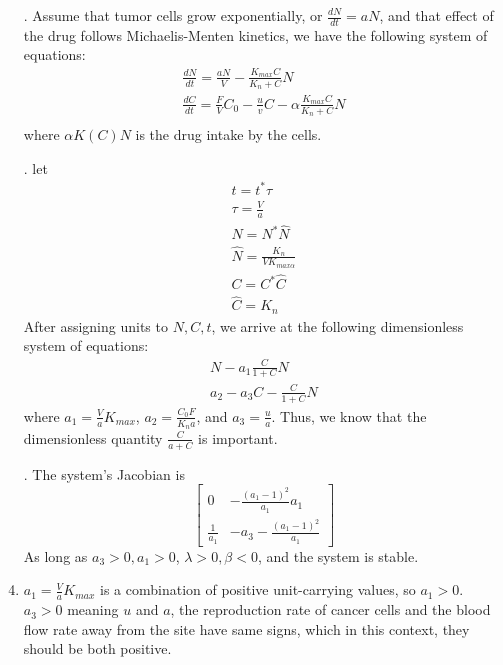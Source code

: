 
\begin{homeworkProblem}[25]
\begin{enumerate}
\addtocounter{enumi}{1}
\item[\color{red}\theenumi.]
    Assume that tumor cells grow exponentially, or $\frac{dN}{dt} = aN $, and that effect of the drug follows Michaelis-Menten kinetics, we have the following system of equations: \begin{align*}
        \frac{dN}{dt} = \frac{aN}{V} - \frac{K_{max}C}{K_n + C}N \\
        \frac{dC}{dt} = \frac{F}{V}C_0 - \frac{u}{v}C - \alpha\frac{K_{max}C}{K_n +C}N \\
    \end{align*}
    where $\alpha K(C) N$ is the drug intake by the cells.
    
\addtocounter{enumi}{1}
\item[\color{red}\theenumi.]
    let \begin{align*}
        t = t^* \tau \\
        \tau = \frac{V}{a} \\
        N = N^*\hat{N} \\
        \hat{N} = \frac{K_n}{V K_{max \alpha}} \\
        C = C^* \hat{C} \\
        \hat{C} =  K_n
    \end{align*}
    After assigning units to $N,C,t$, we arrive at the following dimensionless system of equations: \begin{align}
        N - a_1 \frac{C}{1+C}N \\
        a_2 - a_3 C - \frac{C}{1+C}N 
    \end{align}
    where $a_1 = \frac{V}{a}K_{max}$, $a_2 = \frac{C_0F}{K_na}$, and $a_3 = \frac{u}{a}$.
    Thus, we know that the dimensionless quantity $\frac{C}{a+C}$ is important.
    
\addtocounter{enumi}{1}
\item[\color{red}\theenumi.]
    The system's Jacobian is $$\begin{bmatrix}
    0 & -\frac{(a_1 - 1)^2}{a_1} a_1 \\
    \frac{1}{a_1} & -a_3 -\frac{(a_1 - 1)^2}{a_1}
    \end{bmatrix}$$
    As long as $a_3 > 0, a_1 > 0$, $\lambda > 0, \beta < 0$, and the system is stable.
    
    \item
    $a_1 = \frac{V}{a}K_{max}$ is a combination of positive unit-carrying values, so $a_1 > 0$. $a_3 > 0$ meaning $u$ and $a$, the reproduction rate of cancer cells and the blood flow rate away from the site have same signs, which in this context, they should be both positive. 
    

\end{enumerate}
\end{homeworkProblem}
